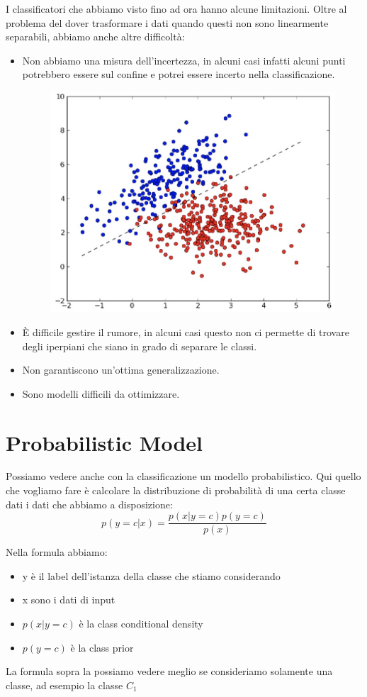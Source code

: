 \documentclass[14pt]{extreport}
\begin{document}
I classificatori che abbiamo visto fino ad ora hanno alcune limitazioni. Oltre al problema del dover trasformare i dati quando questi non sono
linearmente separabili, abbiamo anche altre difficoltà:

\begin{itemize}
\item Non abbiamo una misura dell'incertezza, in alcuni casi infatti alcuni punti potrebbero essere sul confine e potrei essere incerto nella
classificazione.\begin{figure}[H]
\centering
\includegraphics[width=0.4\linewidth]{156.jpeg}
\end{figure}
\item È difficile gestire il rumore, in alcuni casi questo non ci permette di trovare degli iperpiani che siano in grado di separare le classi.
\item Non garantiscono un'ottima generalizzazione.
\item Sono modelli difficili da ottimizzare.
\end{itemize}

\section{Probabilistic Model}

Possiamo vedere anche con la classificazione un modello probabilistico. Qui quello che vogliamo fare è calcolare la distribuzione di probabilità di
una certa classe dati i dati che abbiamo a disposizione:
$$p(y=c|x) = \frac{p(x | y=c)p(y=c)}{p(x)}$$

Nella formula abbiamo:
\begin{itemize}
\item y è il label dell'istanza della classe che stiamo considerando
\item x sono i dati di input
\item $p(x|y=c)$ è la class conditional density
\item $p(y=c)$ è la class prior
\end{itemize}

La formula sopra la possiamo vedere meglio se consideriamo solamente una classe, ad esempio la classe $C_1$
\end{document}
